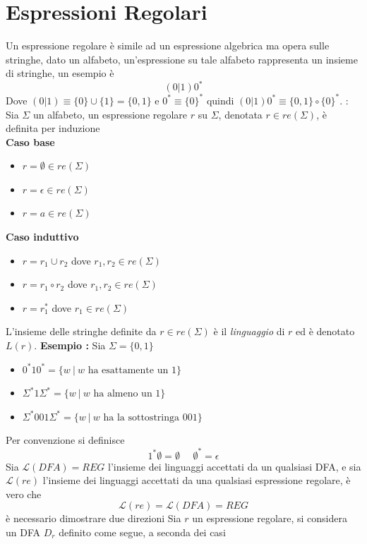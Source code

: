 \documentclass[10pt, letterpaper]{report}
\begin{document}
\section{Espressioni Regolari}
 Un espressione regolare è simile ad un espressione algebrica ma opera sulle stringhe, dato un alfabeto, un'espressione 
 su tale alfabeto rappresenta un insieme di stringhe, un esempio è 
 $$(0|1)0^*$$ 
 Dove $(0|1)\equiv \{0\}\cup \{1\}=\{0,1\}$ e $0^*\equiv\{0\}^*$ quindi $(0|1)0^*\equiv \{0,1\}\circ \{0\}^*$.\acc 
  : Sia $\Sigma$ un alfabeto, un espressione regolare $r$ su $\Sigma$, denotata 
 $r\in re(\Sigma)$, è definita per induzione \\ 
 \textbf{Caso base}\begin{itemize}
    \item $r=\emptyset\in re(\Sigma)$
    \item $r=\epsilon\in re(\Sigma)$
    \item $r=a\in re(\Sigma)$
 \end{itemize}
 \textbf{Caso induttivo}\begin{itemize}
    \item $r=r_1\cup r_2$ dove $r_1,r_2\in re(\Sigma)$
    \item $r=r_1\circ r_2$ dove $r_1,r_2\in re(\Sigma)$
    \item $r=r_1^*$ dove $r_1\in re(\Sigma)$
 \end{itemize}
L'insieme delle stringhe definite da  $r\in re(\Sigma)$ è il \textit{linguaggio} di $r$ ed è denotato $L(r)$.\acc 
\textbf{Esempio : } Sia $\Sigma = \{0,1\}$\begin{itemize}
    \item $0^*10^*=\{w\ | \ w \text{ ha esattamente un }1\}$
    \item $\Sigma^*1\Sigma^*=\{w\ | \ w \text{ ha almeno un }1\}$
    \item $\Sigma^*001\Sigma^*=\{w\ | \ w \text{ ha la sottostringa }001\}$
\end{itemize}
Per convenzione si definisce $$1^*\emptyset = \emptyset \ \ \ \ \ \ \emptyset^*=\epsilon $$
 Sia $\mathcal{L}(DFA)=REG$ l'insieme dei linguaggi accettati da un qualsiasi DFA, e sia 
$\mathcal{L}(re)$   l'insieme dei linguaggi accettati da una qualsiasi espressione regolare, è vero che 
$$\mathcal{L}(re)=\mathcal{L}(DFA)=REG $$
\dimo{} è necessario dimostrare due direzioni\acc
{} Sia $r$ un espressione regolare, si considera un DFA 
$D_r$ definito come segue, a seconda dei casi\acc 
\end{document}
